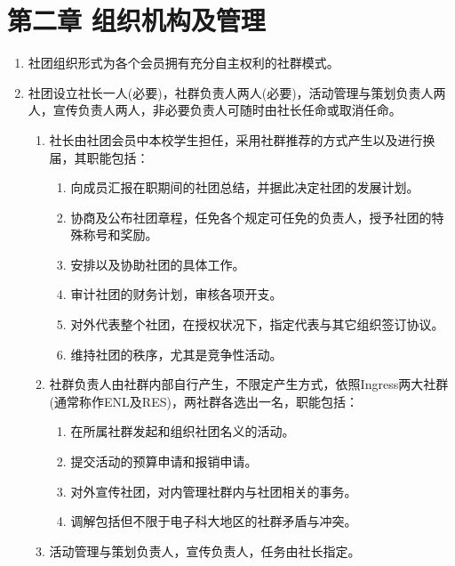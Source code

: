\documentclass[a4paper]{article}
\newcommand\liststyleWWNumviii{%
\renewcommand\theenumi{\arabic{enumi}}
\renewcommand\theenumii{\arabic{enumi}.\arabic{enumii}}
\renewcommand\theenumiii{\arabic{enumi}.\arabic{enumii}.\arabic{enumiii}}
\renewcommand\theenumiv{\arabic{enumi}.\arabic{enumii}.\arabic{enumiii}.\arabic{enumiv}}
\renewcommand\labelenumi{\theenumi.}
\renewcommand\labelenumii{\theenumii.}
\renewcommand\labelenumiii{\theenumiii.}
\renewcommand\labelenumiv{\theenumiv.}
}
\begin{document}
\section[第二章 组织机构及管理]{第二章 组织机构及管理}
\liststyleWWNumviii
\begin{enumerate}
\item 社团组织形式为各个会员拥有充分自主权利的社群模式。
\item 社团设立社长一人(必要)，社群负责人两人(必要)，活动管理与策划负责人两人，宣传负责人两人，非必要负责人可随时由社长任命或取消任命。

\begin{enumerate}
\item 社长由社团会员中本校学生担任，采用社群推荐的方式产生以及进行换届，其职能包括：

\begin{enumerate}
\item 向成员汇报在职期间的社团总结，并据此决定社团的发展计划。
\item 协商及公布社团章程，任免各个规定可任免的负责人，授予社团的特殊称号和奖励。
\item 安排以及协助社团的具体工作。
\item 审计社团的财务计划，审核各项开支。
\item 对外代表整个社团，在授权状况下，指定代表与其它组织签订协议。
\item 维持社团的秩序，尤其是竞争性活动。
\end{enumerate}
\item 社群负责人由社群内部自行产生，不限定产生方式，依照Ingress两大社群(通常称作ENL及RES)，两社群各选出一名，职能包括：

\begin{enumerate}
\item 在所属社群发起和组织社团名义的活动。
\item 提交活动的预算申请和报销申请。
\item 对外宣传社团，对内管理社群内与社团相关的事务。
\item 调解包括但不限于电子科大地区的社群矛盾与冲突。
\end{enumerate}
\item 活动管理与策划负责人，宣传负责人，任务由社长指定。
\end{enumerate}
\end{enumerate}

\bigskip
\end{document}
